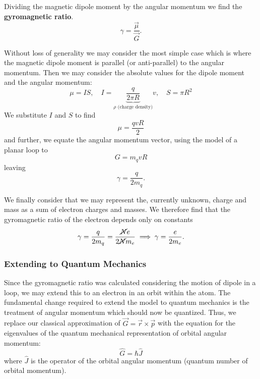 Dividing the magnetic dipole moment by the angular momentum we find the \textbf{gyromagnetic ratio}. 
\begin{equation}
    \gamma = \frac{\vec{\mu}}{\vec{G}}.
    \label{eq:gyromagnetic_ratio}
\end{equation}

Without loss of generality we may consider the most simple case which is where the magnetic dipole moment is parallel (or anti-parallel) to the angular momentum. Then we may consider the absolute values for the dipole moment and the angular momentum: 
\begin{equation}
    \mu = IS, \quad I = \underbrace{\frac{q}{2\pi R}}_{\rho \text{ (charge density)}}v, \quad S = \pi R^2 
\end{equation}
We substitute $I$ and $S$ to find 
\begin{equation}
    \mu = \frac{qvR}{2} 
\end{equation}
and further, we equate the angular momentum vector, using the model of a planar loop to 
\begin{equation}
   G= m_q v R 
\end{equation}
leaving 
\begin{equation}
    \gamma = \frac{q}{2m_q } . 
\end{equation}

We finally consider that we may represent the, currently unknown, charge and mass as a sum of electron charges and masses. We therefore find that the gyromagnetic ratio of the electron depends only on constants 
\begin{equation}
    \gamma = \frac{q}{2m_q } = \frac{\cancel{N}e}{2\cancel{N} m_e} \implies \gamma = \frac{e}{2 m_e}.
\end{equation}


\cite{bromley2000quantum}


\subsubsection{Extending to Quantum Mechanics}
Since the gyromagnetic ratio was calculated considering the motion of dipole in a loop, we may extend this to an electron in an orbit within the atom. The fundamental change required to extend the model to quantum mechanics is the treatment of angular momentum which should now be quantized. 
Thus, we replace our classical approximation of $\vec{G} = \vec{r} \times \vec{p}$ with the equation for the eigenvalues of the quantum mechanical representation of orbital angular momentum:
\begin{equation}
    \hat{G} = \hbar \hat{J} 
\end{equation}
where $\hat{J}$ is the operator of the orbital angular momentum (quantum number of orbital momentum). 


